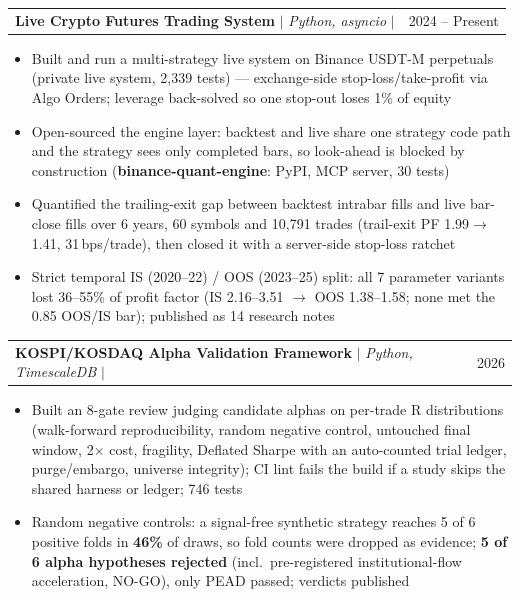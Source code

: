 \documentclass[letterpaper,11pt]{article}
\makeatletter
\newcommand{\resumeItem}[1]{\item\small{{#1 \vspace{-2pt}}}}
\newcommand{\resumeProjectHeading}[2]{
    \item
    \begin{tabular*}{0.97\textwidth}{l@{\extracolsep{\fill}}r}
      \small#1 & #2 \\
    \end{tabular*}\vspace{-7pt}
}
\newcommand{\resumeItemListStart}{\begin{itemize}[itemsep=0pt]}
\newcommand{\resumeItemListEnd}{\end{itemize}\vspace{-5pt}}
\makeatother
\begin{document}
    \resumeProjectHeading
        {\textbf{Live Crypto Futures Trading System} $|$ \emph{Python, asyncio} $|$ \normalfont{\href{https://github.com/younghwan91/binance-quant-engine}{\underline{engine (public)}}, \href{https://github.com/younghwan91/crypto-quant-insights}{\underline{research notes}}}}{2024 -- Present}
        \resumeItemListStart
          \resumeItem{Built and run a multi-strategy live system on Binance USDT-M perpetuals (private live system, 2,339 tests) --- exchange-side stop-loss/take-profit via Algo Orders; leverage back-solved so one stop-out loses 1\% of equity}
          \resumeItem{Open-sourced the engine layer: backtest and live share one strategy code path and the strategy sees only completed bars, so look-ahead is blocked by construction (\textbf{binance-quant-engine}: PyPI, MCP server, 30 tests)}
          \resumeItem{Quantified the trailing-exit gap between backtest intrabar fills and live bar-close fills over 6 years, 60 symbols and 10,791 trades (trail-exit PF 1.99$\to$1.41, 31\,bps/trade), then closed it with a server-side stop-loss ratchet}
          \resumeItem{Strict temporal IS (2020--22) / OOS (2023--25) split: all 7 parameter variants lost 36--55\% of profit factor (IS 2.16--3.51 $\to$ OOS 1.38--1.58; none met the 0.85 OOS/IS bar); published as 14 research notes}
        \resumeItemListEnd

    \resumeProjectHeading
        {\textbf{KOSPI/KOSDAQ Alpha Validation Framework} $|$ \emph{Python, TimescaleDB} $|$ \normalfont{\href{https://github.com/younghwan91/swing-it}{\underline{github}}}}{2026}
        \resumeItemListStart
          \resumeItem{Built an 8-gate review judging candidate alphas on per-trade R distributions (walk-forward reproducibility, random negative control, untouched final window, 2$\times$ cost, fragility, Deflated Sharpe with an auto-counted trial ledger, purge/embargo, universe integrity); CI lint fails the build if a study skips the shared harness or ledger; 746 tests}
          \resumeItem{Random negative controls: a signal-free synthetic strategy reaches 5 of 6 positive folds in \textbf{46\%} of draws, so fold counts were dropped as evidence; \textbf{5 of 6 alpha hypotheses rejected} (incl.\ pre-registered institutional-flow acceleration, NO-GO), only PEAD passed; verdicts published}
        \resumeItemListEnd
\end{document}
